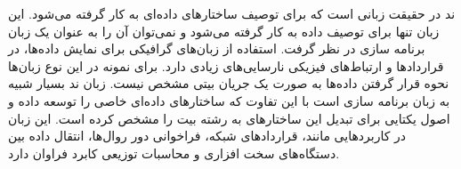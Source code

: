 ند در حقیقت زبانی است که برای توصیف ساختارهای داده‌ای به کار گرفته می‌شود. این
زبان تنها برای توصیف داده به کار گرفته می‌شود و نمی‌توان آن را به عنوان یک زبان
برنامه سازی در نظر گرفت.
استفاده از زبان‌های گرافیکی برای نمایش داده‌ها، در قراردادها و ارتباط‌های فیزیکی
نارسایی‌های زیادی دارد.
برای نمونه در این نوع زبان‌ها نحوه قرار گرفتن داده‌ها به صورت یک جریان بیتی مشخص
نیست.
زبان ند بسیار شبیه به زبان برنامه سازی  است با این تفاوت که ساختارهای
داده‌ای خاصی را توسعه داده و اصول یکتایی برای تبدیل این ساختارهای به رشته بیت را
مشخص کرده است.
این زبان در کاربردهایی مانند، قراردادهای شبکه، فراخوانی دور روال‌ها، انتقال داده
بین دستگاه‌های سخت افزاری و محاسبات توزیعی کابرد فراوان دارد.







